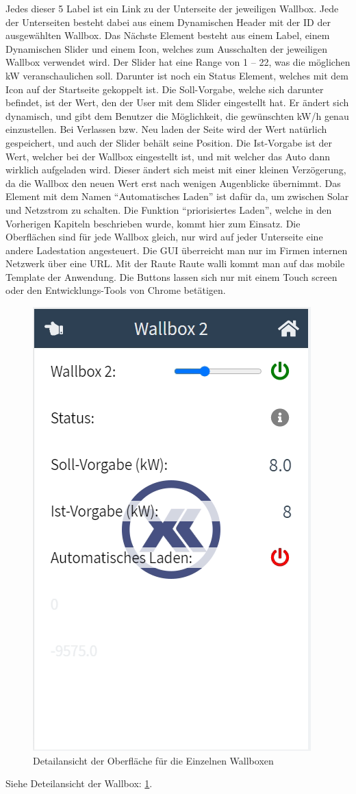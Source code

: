 Jedes dieser 5 Label ist ein Link zu der Unterseite der jeweiligen Wallbox. Jede der Unterseiten besteht dabei aus einem Dynamischen Header mit der ID der ausgewählten Wallbox. Das Nächste Element besteht aus einem Label, einem Dynamischen Slider und einem Icon, welches zum Ausschalten der jeweiligen Wallbox verwendet wird. Der Slider hat eine Range von 1 – 22, was die möglichen kW veranschaulichen soll. Darunter ist noch ein Status Element, welches mit dem Icon auf der Startseite gekoppelt ist. Die Soll-Vorgabe, welche sich darunter befindet, ist der Wert, den der User mit dem Slider eingestellt hat. Er ändert sich dynamisch, und gibt dem Benutzer die Möglichkeit, die gewünschten kW/h genau einzustellen. Bei Verlassen bzw. Neu laden der Seite wird der Wert natürlich gespeichert, und auch der Slider behält seine Position. Die Ist-Vorgabe ist der Wert, welcher bei der Wallbox eingestellt ist, und mit welcher das Auto dann wirklich aufgeladen wird. Dieser ändert sich meist mit einer kleinen Verzögerung, da die Wallbox den neuen Wert erst nach wenigen Augenblicke übernimmt. Das Element mit dem Namen “Automatisches Laden” ist dafür da, um zwischen Solar und Netzstrom zu schalten. Die Funktion “priorisiertes Laden”, welche in den Vorherigen Kapiteln beschrieben wurde, kommt hier zum Einsatz. Die Oberflächen sind für jede Wallbox gleich, nur wird auf jeder Unterseite eine andere Ladestation angesteuert. Die GUI überreicht man nur im Firmen internen Netzwerk über eine URL. Mit der Raute Raute walli kommt man auf das mobile Template der Anwendung. Die Buttons lassen sich nur mit einem Touch screen oder den Entwicklungs-Tools von Chrome betätigen.  


\begin{figure}
  \centering
  \includegraphics[scale=0.5]{pics/DetailansichtWallbox2.png}
  \caption{Detailansicht der Oberfläche für die Einzelnen Wallboxen }
  \label{fig:impl:HMIWallboxDetail}
\end{figure}

Siehe Deteilansicht der Wallbox: \ref{fig:impl:HMIWallboxDetail}.

